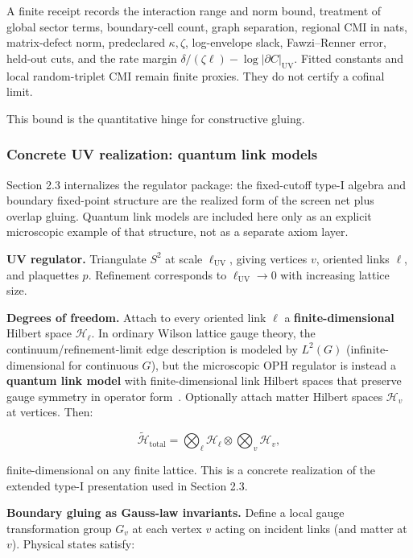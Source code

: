A finite receipt records the interaction range and norm bound, treatment of global sector terms,
boundary-cell count, graph separation, regional CMI in nats, matrix-defect norm, predeclared
\(\kappa,\zeta\), log-envelope slack, Fawzi--Renner error, held-out cuts, and the rate margin
\(\delta/(\zeta\ell)-\log|\partial C|_{\mathrm{UV}}\). Fitted constants and local random-triplet
CMI remain finite proxies. They do not certify a cofinal limit.

This bound is the quantitative hinge for constructive gluing.

\subsubsection{Concrete UV realization: quantum link models}\label{26-concrete-uv-realization-quantum-link-models}

Section 2.3 internalizes the regulator package: the fixed-cutoff type-I algebra and boundary fixed-point structure are the realized form of the screen net plus overlap gluing. Quantum link models are included here only as an explicit microscopic example of that structure, not as a separate axiom layer.

\textbf{UV regulator.} Triangulate \(S^2\) at scale \(\ell_{\mathrm{UV}}\), giving vertices \(v\), oriented links \(\ell\), and plaquettes \(p\). Refinement corresponds to \(\ell_{\mathrm{UV}} \to 0\) with increasing lattice size.

\textbf{Degrees of freedom.} Attach to every oriented link \(\ell\) a \textbf{finite-dimensional} Hilbert space \(\mathcal{H}_\ell\). In ordinary Wilson lattice gauge theory, the continuum/refinement-limit edge description is modeled by \(L^2(G)\) (infinite-dimensional for continuous \(G\)), but the microscopic OPH regulator is instead a \textbf{quantum link model} with finite-dimensional link Hilbert spaces that preserve gauge symmetry in operator form~\cite{cw97}. Optionally attach matter Hilbert spaces \(\mathcal{H}_v\) at vertices. Then:

\[
\tilde{\mathcal{H}}_{\mathrm{total}} = \bigotimes_\ell \mathcal{H}_\ell \otimes \bigotimes_v \mathcal{H}_v,
\]

finite-dimensional on any finite lattice. This is a concrete realization of the extended type-I presentation used in Section 2.3.

\textbf{Boundary gluing as Gauss-law invariants.} Define a local gauge transformation group \(G_v\) at each vertex \(v\) acting on incident links (and matter at \(v\)). Physical states satisfy:

